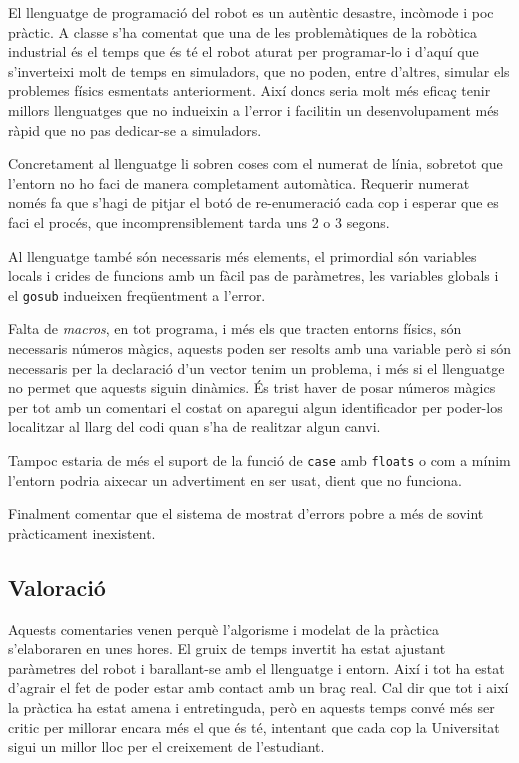 El llenguatge de programació del robot es un autèntic desastre, incòmode i
poc pràctic. A classe s'ha comentat que una de les problemàtiques de la robòtica 
industrial és el temps que és té el robot aturat per programar-lo i 
d'aquí que s'inverteixi molt de temps en simuladors, que no poden, entre d'altres, simular
els problemes físics esmentats anteriorment. Així doncs seria molt més
eficaç tenir millors llenguatges que no indueixin a l'error i facilitin
un desenvolupament més ràpid que no pas dedicar-se a simuladors.

Concretament al llenguatge li sobren coses com el numerat de línia,
sobretot que l'entorn no ho faci de manera completament automàtica.
Requerir numerat només fa que s'hagi de pitjar el botó de re-enumeració
cada cop i esperar que es faci el procés, que incomprensiblement tarda
uns 2 o 3 segons.

Al llenguatge també són necessaris més elements, el primordial són
variables locals i crides de funcions amb un fàcil pas de paràmetres,
les variables globals i el \texttt{gosub} indueixen freqüentment a l'error.

Falta de \emph{macros}, en tot programa, i més els que tracten entorns físics,
són necessaris números màgics, aquests poden ser resolts amb una variable
però si són necessaris per la declaració d'un vector tenim un problema,
i més si el llenguatge no permet que aquests siguin dinàmics. És
trist haver de posar números màgics per tot amb un comentari el costat
on aparegui algun identificador per poder-los localitzar al llarg del codi
quan s'ha de realitzar algun canvi.

Tampoc estaria de més el suport de la funció de \texttt{case} amb \texttt{floats} 
o com a mínim l'entorn podria aixecar un advertiment en ser usat, dient que no funciona.

Finalment comentar que el sistema de mostrat d'errors pobre a més de sovint
pràcticament inexistent.

\subsection{Valoració}
Aquests comentaries venen perquè l'algorisme i modelat de la pràctica s'elaboraren
en unes hores. El gruix de temps invertit ha estat ajustant paràmetres del robot i barallant-se
amb el llenguatge i entorn. Així i tot ha estat d'agrair el fet de poder estar amb contact amb un braç
real. Cal dir que tot i així la pràctica ha estat amena i entretinguda, però en aquests
temps convé més ser critic per millorar encara més el que és té, intentant que cada cop la Universitat
sigui un millor lloc per el creixement de l'estudiant.
